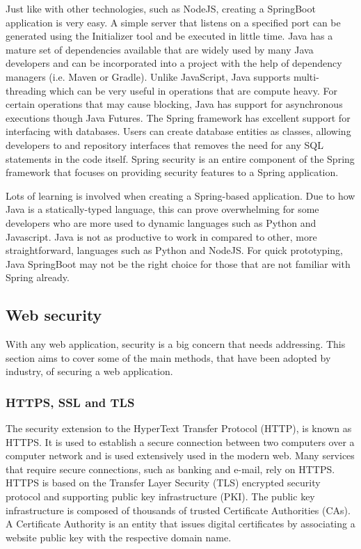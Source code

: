 Just like with other technologies, such as NodeJS, creating a SpringBoot application is very easy. 
A simple server that listens on a specified port can be generated using the Initializer tool and be executed in little time.
Java has a mature set of dependencies available that are widely used by many Java developers and can be incorporated into a project with the help of dependency managers (i.e. Maven or Gradle).
Unlike JavaScript, Java supports multi-threading which can be very useful in operations that are compute heavy.
For certain operations that may cause blocking, Java has support for asynchronous executions though Java Futures.
The Spring framework has excellent support for interfacing with databases.
Users can create database entities as classes, allowing developers to and repository interfaces that removes the need for any SQL statements in the code itself.
Spring security is an entire component of the Spring framework that focuses on providing security features to a Spring application.

Lots of learning is involved when creating a Spring-based application.
Due to how Java is a statically-typed language, this can prove overwhelming for some developers who are more used to dynamic languages 
such as Python and Javascript.
Java is not as productive to work in compared to other, more straightforward, languages such as Python and NodeJS.
For quick prototyping, Java SpringBoot may not be the right choice for those that are not familiar with Spring already.

\subsection{Web security}
With any web application, security is a big concern that needs addressing.
This section aims to cover some of the main methods, that have been adopted by industry, of securing a web application.

\subsubsection{HTTPS, SSL and TLS}
The security extension to the HyperText Transfer Protocol (HTTP), is known as HTTPS.
It is used to establish a secure connection between two computers over a computer network and is used extensively used in the modern web.
Many services that require secure connections, such as banking and e-mail, rely on HTTPS.
HTTPS is based on the Transfer Layer Security (TLS) encrypted security protocol and supporting public key infrastructure (PKI).
The public key infrastructure is composed of thousands of trusted Certificate Authorities (CAs).
A Certificate Authority is an entity that issues digital certificates by associating a website public key with the respective domain name.

